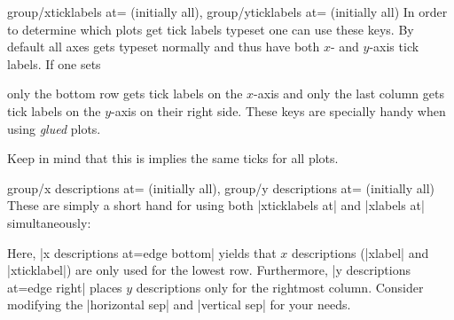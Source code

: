 {\begin{pgfplotskeylist}{%
    group/xticklabels at= (initially all),
    group/yticklabels at= (initially all)%
}
    In order to determine which plots get tick labels typeset one can use these
    keys. By default all axes gets typeset normally and thus have both $x$- and
    $y$-axis tick labels. If one sets
\begin{codeexample}
\pgfplotsset{
    group/xticklabels at=edge bottom,
    group/yticklabels at=edge right,
}
\end{codeexample}
    only the bottom row gets tick labels on the $x$-axis and only the last
    column gets tick labels on the $y$-axis on their right side. These keys are
    specially handy when using \textit{glued} plots.

    Keep in mind that this is implies the same ticks for all plots.
\end{pgfplotskeylist}

\begin{pgfplotskeylist}{%
    group/x descriptions at= (initially all),
    group/y descriptions at= (initially all)%
}
    These are simply a short hand for using both |xticklabels at| and
    |xlabels at| simultaneously:
\begin{codeexample}[]
\end{codeexample}

    Here, |x descriptions at=edge bottom| yields that $x$ descriptions
    (|xlabel| and |xticklabel|) are only used for the lowest row. Furthermore,
    |y descriptions at=edge right| places $y$ descriptions only for the
    rightmost column. Consider modifying the |horizontal sep| and
    |vertical sep| for your needs.


\end{pgfplotskeylist}}
